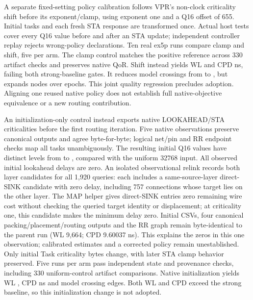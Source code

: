 \documentclass[10pt]{article}
\begin{document}
A separate fixed-setting policy calibration follows VPR's non-clock
criticality shift before its exponent/clamp, using exponent one and a Q16
offset of 655. Initial tasks and each fresh STA response are transformed
once. Actual host tests cover every Q16 value before and after an STA
update; independent controller replay rejects wrong-policy declarations.
Ten real ex5p runs compare clamp and shift, five per arm. The clamp control
matches the positive reference across 330 artifact checks and preserves
native QoR. Shift instead yields WL \CriticalityShiftWL{} and CPD
\CriticalityShiftCPD{} ns, failing both strong-baseline gates. It reduces
model crossings from \PresentWarmCrossings{} to
\CriticalityShiftCrossings{}, but expands \CriticalityShiftExpanded{}
nodes over \CriticalityShiftEpochs{} epochs. This joint quality regression
precludes adoption. Aligning one reused native policy does not establish
full native-objective equivalence or a new routing contribution.

An initialization-only control instead exports native LOOKAHEAD/STA
criticalities before the first routing iteration. Five native observations
preserve canonical outputs and agree byte-for-byte; logical net/pin and
RR endpoint checks map all \InitialObservedTasks{} tasks unambiguously.
The resulting initial Q16 values have \InitialQDistinct{} distinct levels
from \InitialQMin{} to \InitialQMax{}, compared with the uniform 32768
input. All observed initial lookahead delays are zero. An isolated
observational relink records both layer candidates for all 1,920 queries:
each includes a same-source-layer direct-SINK candidate with zero delay,
including 757 connections whose target lies on the other layer. The MAP
helper gives direct-SINK entries zero remaining wire cost without checking
the queried target identity or displacement; at criticality one, this
candidate makes the minimum delay zero. Initial CSVs, four canonical
packing/placement/routing outputs and the RR graph remain byte-identical
to the parent run (WL 9,664; CPD 9.60037 ns). This explains the zeros in
this one observation; calibrated estimates and a corrected policy remain
unestablished. Only initial
Task criticality bytes change, with later STA clamp behavior preserved.
Five runs per arm pass independent state and provenance checks, including
330 uniform-control artifact comparisons. Native initialization yields
WL \InitialNativeWL{}, CPD \InitialNativeCPD{} ns and
\InitialNativeCrossings{} model crossing edges. Both WL and CPD exceed
the strong baseline, so this initialization change is not adopted.
\end{document}
